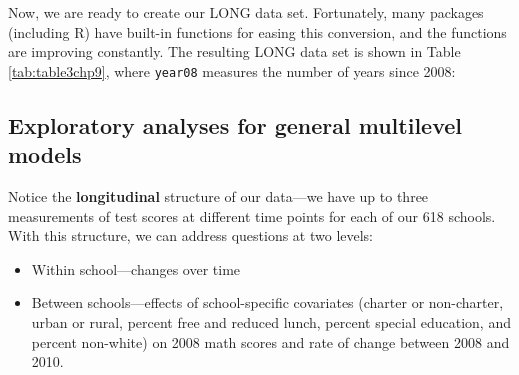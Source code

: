 \documentclass[
]{krantz}
\providecommand{\tightlist}{%
  \setlength{\itemsep}{0pt}\setlength{\parskip}{0pt}}
\begin{document}
Now, we are ready to create our LONG data set. Fortunately, many packages (including R) have built-in functions for easing this conversion, and the functions are improving constantly. The resulting LONG data set is shown in Table \ref{tab:table3chp9}, where \texttt{year08} measures the number of years since 2008:



\begin{table}

\caption{\label{tab:table3chp9}The first six observations in the long data set for the Charter Schools case study; these lines correspond to the first two observations from the wide data set illustrated in Table \ref{tab:table1chp9}.}
\centering
{}
\end{table}

\hypertarget{generalanalyses}{%
\subsection{Exploratory analyses for general multilevel models}\label{generalanalyses}}

Notice the \textbf{longitudinal}  structure of our data---we have up to three measurements of test scores at different time points for each of our 618 schools. With this structure, we can address questions at two levels:

\begin{itemize}
\tightlist
\item
  Within school---changes over time
\item
  Between schools---effects of school-specific covariates (charter or non-charter, urban or rural, percent free and reduced lunch, percent special education, and percent non-white) on 2008 math scores and rate of change between 2008 and 2010.
\end{itemize}
\end{document}
